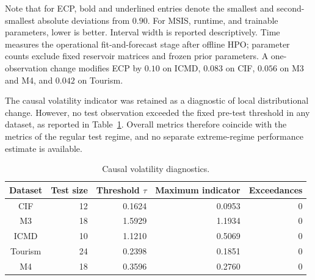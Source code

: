 Note that for ECP, bold and underlined entries denote the smallest and second-smallest
absolute deviations from $0.90$. For MSIS, runtime, and trainable parameters,
lower is better. Interval width is reported descriptively. Time measures the
operational fit-and-forecast stage after offline HPO; parameter counts exclude
fixed reservoir matrices and frozen prior parameters. A one-observation change
modifies ECP by $0.10$ on ICMD, $0.083$ on CIF, $0.056$ on M3 and M4, and
$0.042$ on Tourism.
\normalsize


The causal volatility indicator was retained as a diagnostic of local
distributional change. However, no test observation exceeded the fixed
pre-test threshold in any dataset, as reported in
Table~\ref{tab:volatility_diagnostics}. Overall metrics therefore coincide with
the metrics of the regular test regime, and no separate extreme-regime
performance estimate is available.


\begin{table}[t]
\centering
\caption{Causal volatility diagnostics.}
\label{tab:volatility_diagnostics}
\footnotesize
\setlength{\tabcolsep}{5pt}
\renewcommand{\arraystretch}{0.9999}
\begin{tabular}{|c|r|r|r|r|}
\hline
Dataset & Test size & Threshold $\tau$ & Maximum indicator & Exceedances \\
\hline
CIF     & 12 & 0.1624 & 0.0953 & 0 \\
\hline
M3      & 18 & 1.5929 & 1.1934 & 0 \\
\hline
ICMD    & 10 & 1.1210 & 0.5069 & 0 \\
\hline
Tourism & 24 & 0.2398 & 0.1851 & 0 \\
\hline
M4      & 18 & 0.3596 & 0.2760 & 0 \\
\hline
\end{tabular}
\end{table}

